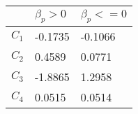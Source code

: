    \begin{tabular}{l l l}
\toprule
\sphinxstyletheadfamily &\sphinxstyletheadfamily 

\(\beta_p>0\)
&\sphinxstyletheadfamily 

\(\beta_p<=0\)
\\
\hline

\(C_1\)
&

-0.1735
&

-0.1066
\\


\(C_2\)
&

0.4589
&

0.0771
\\


\(C_3\)
&

-1.8865
&

1.2958
\\


\(C_4\)
&

0.0515
&

0.0514
\\
\bottomrule
\end{tabular}


